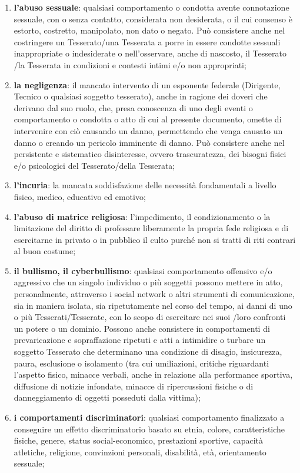 \documentclass{djtsasddoc}
\begin{document}
\begin{enumerate}
\begin{enumerate}
			\item \textbf{l'abuso sessuale}: qualsiasi comportamento o condotta avente connotazione sessuale, con o	senza contatto, considerata non desiderata, o il cui consenso è estorto, costretto, manipolato,	non dato o negato. Può consistere anche nel costringere un Tesserato/una Tesserata a porre in	essere condotte sessuali inappropriate o indesiderate o nell'osservare, anche di nascosto, il	Tesserato /la Tesserata in condizioni e contesti intimi e/o non appropriati;
			\item \textbf{la negligenza}: il mancato intervento di un esponente federale (Dirigente, Tecnico o qualsiasi soggetto tesserato), anche in ragione dei doveri che derivano dal suo ruolo, che, presa	conoscenza di uno degli eventi o comportamento o condotta o atto di cui al presente documento, omette di intervenire con ciò causando un danno, permettendo che venga causato	un danno o creando un pericolo imminente di danno. Può consistere anche nel persistente e sistematico disinteresse, ovvero trascuratezza, dei bisogni fisici e/o psicologici del Tesserato/della Tesserata;
			\item \textbf{l'incuria}: la mancata soddisfazione delle necessità fondamentali a livello fisico, medico,	educativo ed emotivo;
			\item \textbf{l'abuso di matrice religiosa}: l'impedimento, il condizionamento o la limitazione del diritto di professare liberamente la propria fede religiosa e di esercitarne in privato o in pubblico il culto purché non si tratti di riti contrari al buon costume;
			\item \textbf{il bullismo, il cyberbullismo}: qualsiasi comportamento offensivo e/o aggressivo che un	singolo individuo o più soggetti possono mettere in atto, personalmente, attraverso i social	network o altri strumenti di comunicazione, sia in maniera isolata, sia ripetutamente nel corso del tempo, ai danni di uno o più Tesserati/Tesserate, con lo scopo di esercitare nei suoi /loro confronti un potere o un dominio. Possono anche consistere in comportamenti di	prevaricazione e sopraffazione ripetuti e atti a intimidire o turbare un soggetto Tesserato che determinano una condizione di disagio, insicurezza, paura, esclusione o isolamento (tra cui umiliazioni, critiche riguardanti l'aspetto fisico, minacce verbali, anche in relazione alla performance sportiva, diffusione di notizie infondate, minacce di ripercussioni fisiche o di danneggiamento di oggetti posseduti dalla vittima);
			\item \textbf{i comportamenti discriminatori}: qualsiasi comportamento finalizzato a conseguire un effetto discriminatorio basato su etnia, colore, caratteristiche fisiche, genere, status social-economico, prestazioni sportive, capacità atletiche, religione, convinzioni personali, disabilità, età, orientamento sessuale;

\end{enumerate}
\end{enumerate}
\end{document}
